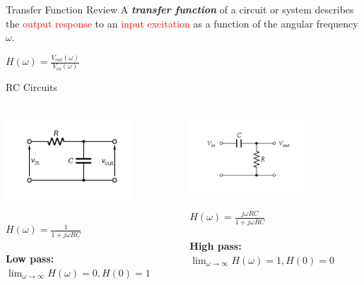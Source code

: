 \documentclass{beamer}
\begin{document}
    \begin{frame}{Transfer Function Review}
        A \textbf{\emph{transfer function}} of a circuit or system describes the \textcolor{red}{output response} to an \textcolor{red}{input excitation} as a function of the angular frequency $\omega$.
        \begin{center}
            $H(\omega) = \frac{V_{out}(\omega)}{V_{in}(\omega)}$
        \end{center}
    \end{frame}
    \begin{frame}{RC Circuits}
        \begin{columns}
            \begin{column}{0.5\textwidth}
            \includegraphics[]{rc-circuits_1.png}\\ \\
                $H(\omega) = \frac{1}{1 + j\omega RC}$\\ \\
                \textbf{Low pass:} $\lim_{\omega\to\infty} H(\omega) = 0, H(0) = 1$
                
            \end{column}
            \begin{column}{0.5\textwidth}
            \includegraphics[]{rc-circuits_2.png} \\ \\ 
                $H(\omega) = \frac{j\omega RC}{1 + j\omega RC}$\\ \\
                \textbf{High pass:} $\lim_{\omega\to\infty} H(\omega) = 1, H(0) = 0$
            \end{column}
            
        \end{columns}
    \end{frame}
    
\end{document}
